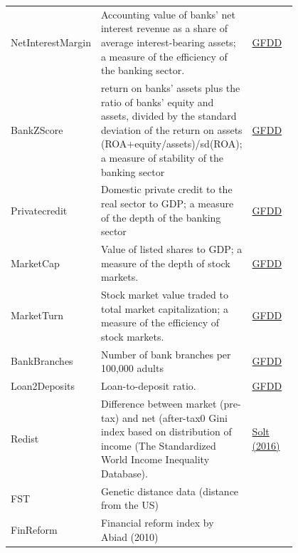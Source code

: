 \begin{refsection}
\begin{subappendices}
\begin{center}
\begin{longtable}{l p{0.50\linewidth} p{0.3\linewidth}}
      NetInterestMargin & Accounting value of banks' net interest revenue as a share of average interest-bearing assets; a measure of the efficiency of the banking sector. & \href{http://data.worldbank.org/data-catalog/global-financial-development}{GFDD} \\
      
      BankZScore & return on banks' assets plus the ratio of banks' equity and assets, divided
      by the standard deviation of the return on assets (ROA+equity/assets)/sd(ROA); a measure of stability of the banking sector & \href{http://data.worldbank.org/data-catalog/global-financial-development}{GFDD} \\
      
      Privatecredit & Domestic private credit to the real sector to GDP; a measure of the depth of the banking sector & \href{http://data.worldbank.org/data-catalog/global-financial-development}{GFDD} \\
      
      MarketCap & Value of listed shares to GDP; a measure of the
      depth of stock markets.& \href{http://data.worldbank.org/data-catalog/global-financial-development}{GFDD} \\
      
      MarketTurn & Stock market value traded to total market capitalization; a measure of the efficiency of stock markets. & \href{http://data.worldbank.org/data-catalog/global-financial-development}{GFDD} \\
      
      BankBranches & Number of bank branches per 100,000 adults & \href{http://data.worldbank.org/data-catalog/global-financial-development}{GFDD} \\
    
      Loan2Deposits & Loan-to-deposit ratio. & \href{http://data.worldbank.org/data-catalog/global-financial-development}{GFDD} \\
      
      Redist & Difference between market (pre-tax) and net (after-tax0 Gini index based on distribution of income  (The Standardized World Income Inequality Database). & \href{http://fsolt.org/swiid/}{Solt (2016)} \\	
    
      FST & Genetic distance data (distance from the US) & \href{https://sites.tufts.edu/enricospolaore/research/}{\textcite{spolaore2009diffusion}} \\
    
      FinReform & Financial reform index by Abiad (2010) & \href{https://www.imf.org/en/Publications/WP/Issues/2016/12/31/A-New-Database-of-Financial-Reforms-22485}{\textcite{Abiadetal2008}} \\
    

\end{longtable}
\end{center}
\end{subappendices}
\end{refsection}
